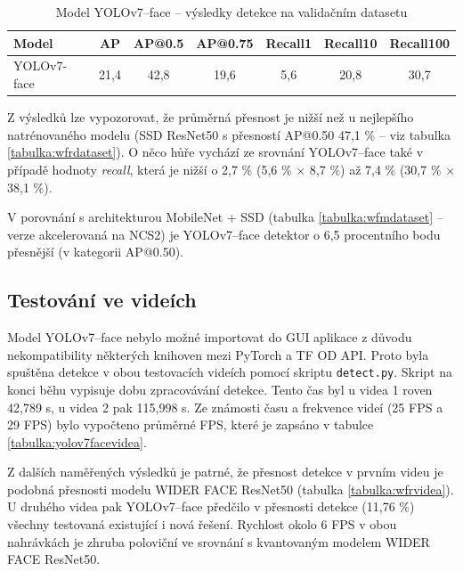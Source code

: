 \begin{table}[H]
  \begin{center}
    \begin{tabular}{|l|c|c|c|c|c|c|}
    \hline
    \rowcolor[HTML]{E0DBDB} 
    \textbf{Model}                      & \textbf{AP} & \textbf{AP@0.5} & \textbf{AP@0.75} & \textbf{Recall1} & \textbf{Recall10} & \textbf{Recall100} \\ \hline
    \cellcolor[HTML]{E0DBDB}YOLOv7-face & 21,4        & 42,8            & 19,6             & 5,6              & 20,8              & 30,7               \\ \hline
    \end{tabular}
    \label{tabulka:yolov7face}
    \caption{Model YOLOv7--face -- výsledky detekce na validačním datasetu}
  \end{center}
\end{table}

Z výsledků lze vypozorovat, že průměrná přesnost je nižší než u nejlepšího natrénovaného modelu (SSD ResNet50 s přesností AP@0.50 47,1 \% -- viz tabulka \ref{tabulka:wfrdataset}). O něco hůře vychází ze srovnání YOLOv7--face také v případě hodnoty \emph{recall}, která je nižší o 2,7 \% (5,6 \% $\times$ 8,7 \%) až 7,4 \% (30,7 \% $\times$ 38,1 \%). 

V porovnání s architekturou MobileNet + SSD (tabulka \ref{tabulka:wfmdataset} -- verze akcelerovaná na NCS2) je YOLOv7--face detektor o 6,5 procentního bodu přesnější (v kategorii AP@0.50).


\subsection*{Testování ve videích}
Model YOLOv7--face nebylo možné importovat do GUI aplikace z důvodu nekompatibility některých knihoven mezi PyTorch a TF OD API. Proto byla spuštěna detekce v obou testovacích videích pomocí skriptu \texttt{detect.py}. Skript na konci běhu vypisuje dobu zpracovávání detekce. Tento čas byl u videa 1 roven 42,789 s, u videa 2 pak 115,998 s. Ze známosti času a frekvence videí (25 FPS a 29 FPS) bylo vypočteno průměrné FPS, které je zapsáno v tabulce \ref{tabulka:yolov7facevidea}. 

Z dalších naměřených výsledků je patrné, že přesnost detekce v prvním videu je podobná přesnosti modelu WIDER FACE ResNet50 (tabulka \ref{tabulka:wfrvidea}). U druhého videa pak YOLOv7--face předčilo v přesnosti detekce (11,76 \%) všechny testovaná existující i nová řešení. Rychlost okolo 6 FPS v obou nahrávkách je zhruba poloviční ve srovnání s kvantovaným modelem WIDER FACE ResNet50.



